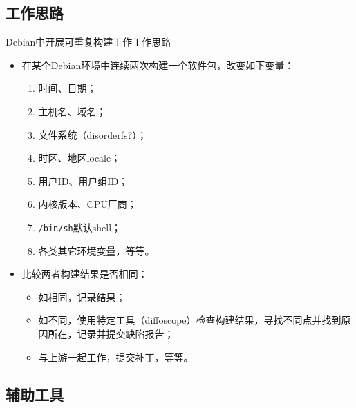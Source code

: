 \documentclass{beamer}
\begin{document}
\subsection{工作思路}
\begin{frame}{Debian中开展可重复构建工作}{工作思路}
\begin{itemize}
\item {在某个Debian环境中连续两次构建一个软件包，改变如下变量：
  \begin{enumerate}
  \item 时间、日期；
  \item 主机名、域名；
  \item 文件系统（disorderfs?）；
  \item 时区、地区locale；
  \item 用户ID、用户组ID；
  \item 内核版本、CPU厂商；
  \item \texttt{/bin/sh}默认shell；
  \item 各类其它环境变量，等等。
  \end{enumerate}
  }
\item {比较两者构建结果是否相同：
  \begin{itemize}
    \item 如相同，记录结果；
    \item 如不同，使用特定工具（diffoscope）检查构建结果，寻找不同点并找到原因所在，记录并提交缺陷报告；
    \item 与上游一起工作，提交补丁，等等。
  \end{itemize}
}
\end{itemize}
\end{frame}
\subsection{辅助工具}
\end{document}
